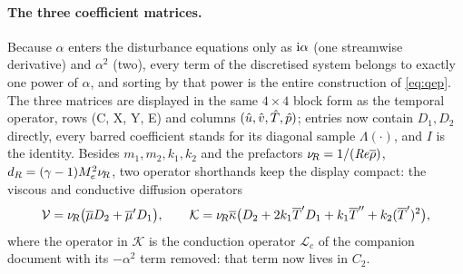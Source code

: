 \documentclass[11pt]{article}
\begin{document}
\paragraph{The three coefficient matrices.} Because $\alpha$ enters the disturbance equations only
as $\mathrm{i}\alpha$ (one streamwise derivative) and $\alpha^2$ (two), every term of the discretised
system belongs to exactly one power of $\alpha$, and sorting by that power is the entire
construction of \eqref{eq:qep}. The three matrices are displayed in the same $4\times4$ block form
as the temporal operator, rows (C, X, Y, E) and columns $(\hat{u},\hat{v},\hat{T},\hat{p})$; entries now
contain $D_1,D_2$ directly, every barred coefficient stands for its diagonal sample
$\Lambda(\cdot)$, and $I$ is the identity. Besides $m_1,m_2,k_1,k_2$ and the prefactors
$\nu_{\!R}=1/(\mathit{Re}\overline{\rho})$, $d_R=(\gamma-1)M_e^2\nu_{\!R}$, two operator shorthands keep the display
compact: the viscous and conductive diffusion operators
\begin{equation}\label{eq:VKops}
  \mathcal V=\nu_{\!R}\big(\overline{\mu} D_2+\overline{\mu}'D_1\big),\qquad
  \mathcal K=\nu_{\!R}\overline{\kappa}\big(D_2+2k_1\overline{T}'D_1+k_1\overline{T}''+k_2(\overline{T}')^2\big),
\end{equation}
where the operator in $\mathcal K$ is the conduction operator $\mathcal L_c$ of the companion
document with its $-\alpha^2$ term removed: that term now lives in $C_2$.
\end{document}
